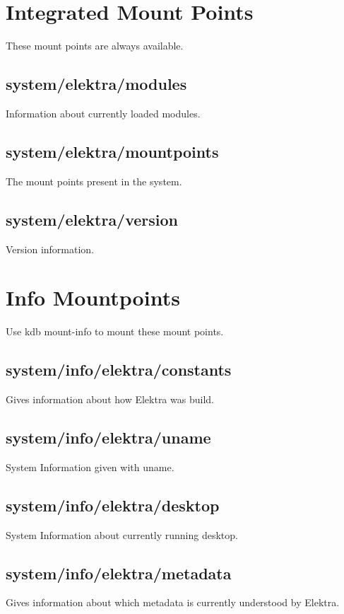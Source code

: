 \hypertarget{doc_help_elektra-hierarchy_md_autotoc_md1553}{}\section{Integrated Mount Points}\label{doc_help_elektra-hierarchy_md_autotoc_md1553}
These mount points are always available.\hypertarget{doc_help_elektra-hierarchy_md_autotoc_md1554}{}\subsection{system/elektra/modules}\label{doc_help_elektra-hierarchy_md_autotoc_md1554}
Information about currently loaded modules.\hypertarget{doc_help_elektra-hierarchy_md_autotoc_md1555}{}\subsection{system/elektra/mountpoints}\label{doc_help_elektra-hierarchy_md_autotoc_md1555}
The mount points present in the system.\hypertarget{doc_help_elektra-hierarchy_md_autotoc_md1556}{}\subsection{system/elektra/version}\label{doc_help_elektra-hierarchy_md_autotoc_md1556}
Version information.\hypertarget{doc_help_elektra-hierarchy_md_autotoc_md1557}{}\section{Info Mountpoints}\label{doc_help_elektra-hierarchy_md_autotoc_md1557}
Use {\ttfamily kdb mount-\/info} to mount these mount points.\hypertarget{doc_help_elektra-hierarchy_md_autotoc_md1558}{}\subsection{system/info/elektra/constants}\label{doc_help_elektra-hierarchy_md_autotoc_md1558}
Gives information about how Elektra was build.\hypertarget{doc_help_elektra-hierarchy_md_autotoc_md1559}{}\subsection{system/info/elektra/uname}\label{doc_help_elektra-hierarchy_md_autotoc_md1559}
System Information given with {\ttfamily uname}.\hypertarget{doc_help_elektra-hierarchy_md_autotoc_md1560}{}\subsection{system/info/elektra/desktop}\label{doc_help_elektra-hierarchy_md_autotoc_md1560}
System Information about currently running desktop.\hypertarget{doc_help_elektra-hierarchy_md_autotoc_md1561}{}\subsection{system/info/elektra/metadata}\label{doc_help_elektra-hierarchy_md_autotoc_md1561}
Gives information about which metadata is currently understood by Elektra.

